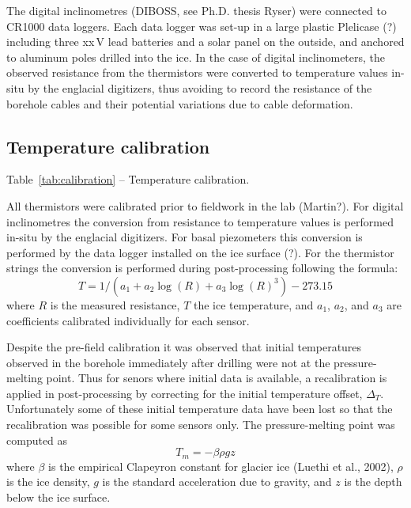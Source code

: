 \documentclass[utf8]{article}
\begin{document}
    The digital inclinometres (DIBOSS, see Ph.D. thesis Ryser) were connected
    to CR1000 data loggers. Each data logger was set-up in a large plastic
    Plelicase (?) including three xx\,V lead batteries and a solar panel on the
    outside, and anchored to aluminum poles drilled into the ice.
    In the case of digital inclinometers, the observed resistance from the
    thermistors were converted to temperature values in-situ by the englacial
    digitizers, thus avoiding to record the resistance of the borehole cables
    and their potential variations due to cable deformation.


\subsection{Temperature calibration}

    Table~\ref{tab:calibration} -- Temperature calibration.

    All thermistors were calibrated prior to fieldwork in the lab (Martin?).
    For digital inclinometres the conversion from resistance to temperature
    values is performed in-situ by the englacial digitizers. For basal
    piezometers this conversion is performed by the data logger installed on
    the ice surface (?). For the thermistor strings the conversion is performed
    during post-processing following the formula:
    \begin{equation}
      T = 1 / (a_1 + a_2 \log(R) + a_3 \log(R)^3) - 273.15
    \end{equation}
    where $R$ is the measured resistance, $T$ the ice temperature, and $a_1$,
    $a_2$, and $a_3$ are coefficients calibrated individually for each sensor.

    Despite the pre-field calibration it was observed that initial temperatures
    observed in the borehole immediately after drilling were not at the
    pressure-melting point. Thus for senors where initial data is available,
    a recalibration is applied in post-processing by correcting for the initial
    temperature offset, $\Delta_T$. Unfortunately some of these initial
    temperature data have been lost so that the recalibration was possible for
    some sensors only. The pressure-melting point was computed as
    \begin{equation}
      T_m = -\beta \rho g z
    \end{equation}
    where $\beta$ is the empirical Clapeyron constant for glacier ice
    (Luethi et al., 2002), $\rho$ is the ice density, $g$ is the standard
    acceleration due to gravity, and $z$ is the depth below the ice surface.
\end{document}
